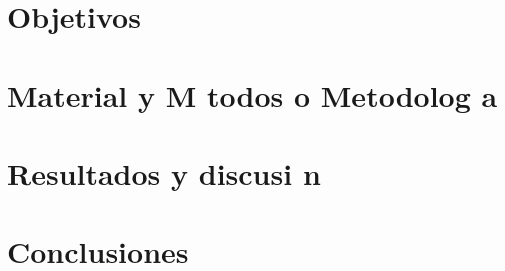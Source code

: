 \documentclass{article}
\begin{document}
\section{Objetivos}


\section{Material y M todos o Metodolog a}


\section{Resultados y discusi n}


\section{Conclusiones}




\nocite{*} %
\renewcommand{\refname}{Referencias bibliogr ficas}

%
\end{document}
